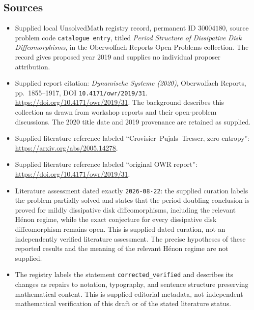 \documentclass[11pt]{article}
\begin{document}
\subsection{Sources}
\begin{itemize}
\item Supplied local UnsolvedMath registry record, permanent ID \(30004180\), source problem code \texttt{catalogue entry}, titled \emph{Period Structure of Dissipative Disk Diffeomorphisms}, in the Oberwolfach Reports Open Problems collection. The record gives proposed year 2019 and supplies no individual proposer attribution.
\item Supplied report citation: \emph{Dynamische Systeme (2020)}, Oberwolfach Reports, pp.\ 1855--1917, DOI \texttt{10.4171/owr/2019/31}. \url{https://doi.org/10.4171/owr/2019/31}. The background describes this collection as drawn from workshop reports and their open-problem discussions. The 2020 title date and 2019 provenance are retained as supplied.
\item Supplied literature reference labeled ``Crovisier--Pujals--Tresser, zero entropy'': \url{https://arxiv.org/abs/2005.14278}.
\item Supplied literature reference labeled ``original OWR report'': \url{https://doi.org/10.4171/owr/2019/31}.
\item Literature assessment dated exactly \texttt{2026-08-22}: the supplied curation labels the problem partially solved and states that the period-doubling conclusion is proved for mildly dissipative disk diffeomorphisms, including the relevant H\'enon regime, while the exact conjecture for every dissipative disk diffeomorphism remains open. This is supplied dated curation, not an independently verified literature assessment. The precise hypotheses of these reported results and the meaning of the relevant H\'enon regime are not supplied.
\item The registry labels the statement \texttt{corrected\_verified} and describes its changes as repairs to notation, typography, and sentence structure preserving mathematical content. This is supplied editorial metadata, not independent mathematical verification of this draft or of the stated literature status.
\end{itemize}
\end{document}
